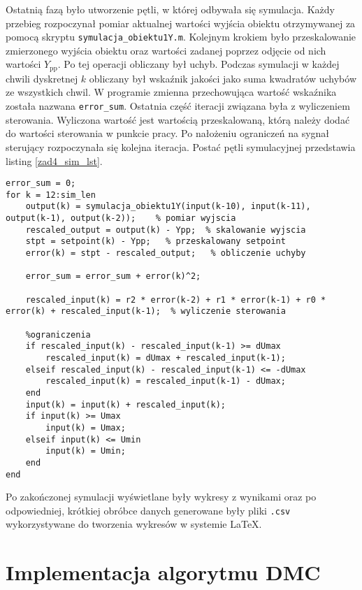 Ostatnią fazą było utworzenie pętli, w której odbywała się symulacja. Każdy przebieg rozpoczynał pomiar aktualnej wartości wyjścia obiektu otrzymywanej za pomocą skryptu \verb+symulacja_obiektu1Y.m+. Kolejnym krokiem było przeskalowanie zmierzonego wyjścia obiektu oraz wartości zadanej poprzez odjęcie od nich wartości $Y_{\mathrm{pp}}$. Po tej operacji obliczany był uchyb. Podczas symulacji w każdej chwili dyskretnej $k$ obliczany był wskaźnik jakości jako suma kwadratów uchybów ze wszystkich chwil. W programie zmienna przechowująca wartość wskaźnika została nazwana \verb+error_sum+. Ostatnia część iteracji związana była z wyliczeniem sterowania. Wyliczona wartość jest wartością przeskalowaną, którą należy dodać do wartości sterowania w punkcie pracy. Po nałożeniu ograniczeń na sygnał sterujący rozpoczynała się kolejna iteracja. Postać pętli symulacyjnej przedstawia listing \ref{zad4_sim_lst}.\\ 
\begin{lstlisting}[style=custommatlab,frame=single,label={zad4_sim_lst},caption={Petla symulujaca dzialanie cyfrowego algorytmu PID},captionpos=b]
error_sum = 0;
for k = 12:sim_len     
    output(k) = symulacja_obiektu1Y(input(k-10), input(k-11), output(k-1), output(k-2));    % pomiar wyjscia
    rescaled_output = output(k) - Ypp;  % skalowanie wyjscia   
    stpt = setpoint(k) - Ypp;   % przeskalowany setpoint
    error(k) = stpt - rescaled_output;   % obliczenie uchyby   
    
    error_sum = error_sum + error(k)^2;
    
    rescaled_input(k) = r2 * error(k-2) + r1 * error(k-1) + r0 * error(k) + rescaled_input(k-1);  % wyliczenie sterowania 
  
    %ograniczenia  
    if rescaled_input(k) - rescaled_input(k-1) >= dUmax
        rescaled_input(k) = dUmax + rescaled_input(k-1);
    elseif rescaled_input(k) - rescaled_input(k-1) <= -dUmax
        rescaled_input(k) = rescaled_input(k-1) - dUmax;
    end   
    input(k) = input(k) + rescaled_input(k);
    if input(k) >= Umax
        input(k) = Umax;
    elseif input(k) <= Umin
        input(k) = Umin;
    end 
end
\end{lstlisting}
Po zakończonej symulacji wyświetlane były wykresy z wynikami oraz po odpowiedniej, krótkiej obróbce danych generowane były pliki \verb+.csv+ wykorzystywane do tworzenia wykresów w systemie \LaTeX.


\section{Implementacja algorytmu DMC}
\label{zad4_dmc}

